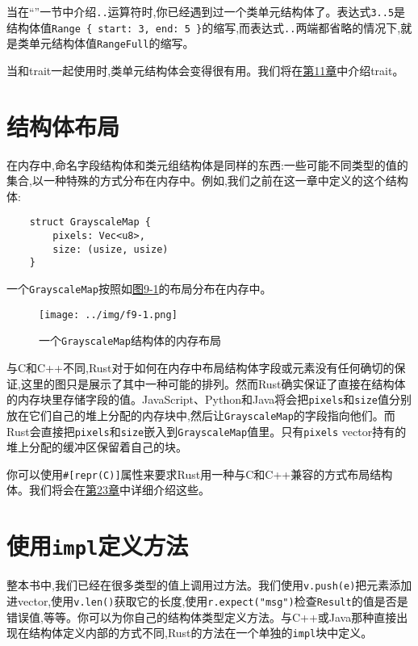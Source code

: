 当在“”一节中介绍\texttt{..}运算符时,你已经遇到过一个类单元结构体了。表达式\texttt{3..5}是结构体值\texttt{Range \{ start: 3, end: 5 \}}的缩写,而表达式\texttt{..}两端都省略的情况下,就是类单元结构体值\texttt{RangeFull}的缩写。

当和trait一起使用时,类单元结构体会变得很有用。我们将在\hyperref[ch11]{第11章}中介绍trait。

\section{结构体布局}

在内存中,命名字段结构体和类元组结构体是同样的东西:一些可能不同类型的值的集合,以一种特殊的方式分布在内存中。例如,我们之前在这一章中定义的这个结构体:
\begin{verbatim}
    struct GrayscaleMap {
        pixels: Vec<u8>,
        size: (usize, usize)
    }
\end{verbatim}

一个\texttt{GrayscaleMap}按照如\hyperref[f9-1]{图9-1}的布局分布在内存中。

\begin{figure}[htbp]
    \centering
    \texttt{[image: ../img/f9-1.png]}
    \caption{一个\texttt{GrayscaleMap}结构体的内存布局}
    \label{f9-1}
\end{figure}

与C和C++不同,Rust对于如何在内存中布局结构体字段或元素没有任何确切的保证,这里的图只是展示了其中一种可能的排列。然而Rust确实保证了直接在结构体的内存块里存储字段的值。JavaScript、Python和Java将会把\texttt{pixels}和\texttt{size}值分别放在它们自己的堆上分配的内存块中,然后让\texttt{GrayscaleMap}的字段指向他们。而Rust会直接把\texttt{pixels}和\texttt{size}嵌入到\texttt{GrayscaleMap}值里。只有\texttt{pixels} vector持有的堆上分配的缓冲区保留着自己的块。

你可以使用\texttt{\#[repr(C)]}属性来要求Rust用一种与C和C++兼容的方式布局结构体。我们将会在\hyperref[ch23]{第23章}中详细介绍这些。

\section{使用\texttt{impl}定义方法}\label{method}

整本书中,我们已经在很多类型的值上调用过方法。我们使用\texttt{v.push(e)}把元素添加进vector,使用\texttt{v.len()}获取它的长度,使用\texttt{r.expect("msg")}检查\texttt{Result}的值是否是错误值,等等。你可以为你自己的结构体类型定义方法。与C++或Java那种直接出现在结构体定义内部的方式不同,Rust的方法在一个单独的\texttt{impl}块中定义。

